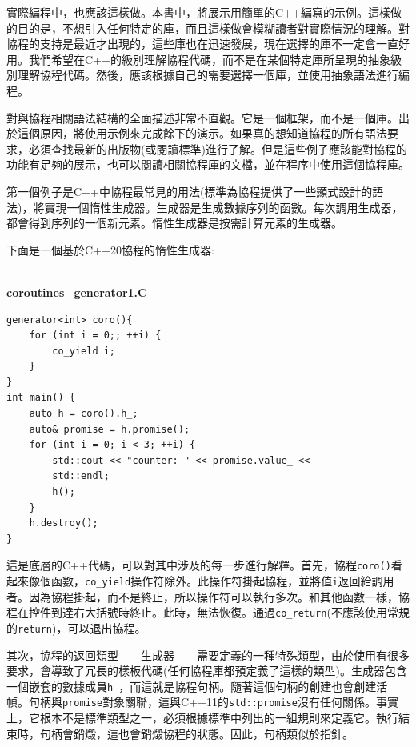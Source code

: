 實際編程中，也應該這樣做。本書中，將展示用簡單的C++編寫的示例。這樣做的目的是，不想引入任何特定的庫，而且這樣做會模糊讀者對實際情況的理解。對協程的支持是最近才出現的，這些庫也在迅速發展，現在選擇的庫不一定會一直好用。我們希望在C++的級別理解協程代碼，而不是在某個特定庫所呈現的抽象級別理解協程代碼。然後，應該根據自己的需要選擇一個庫，並使用抽象語法進行編程。

對與協程相關語法結構的全面描述非常不直觀。它是一個框架，而不是一個庫。出於這個原因，將使用示例來完成餘下的演示。如果真的想知道協程的所有語法要求，必須查找最新的出版物(或閱讀標準)進行了解。但是這些例子應該能對協程的功能有足夠的展示，也可以閱讀相關協程庫的文檔，並在程序中使用這個協程庫。


第一個例子是C++中協程最常見的用法(標準為協程提供了一些顯式設計的語法)，將實現一個惰性生成器。生成器是生成數據序列的函數。每次調用生成器，都會得到序列的一個新元素。惰性生成器是按需計算元素的生成器。

下面是一個基於C++20協程的惰性生成器:

\hspace*{\fill} \\ %
\noindent
\textbf{coroutines\_generator1.C}
\begin{lstlisting}[style=styleCXX]
generator<int> coro(){
	for (int i = 0;; ++i) {
		co_yield i;
	}
}
int main() {
	auto h = coro().h_;
	auto& promise = h.promise();
	for (int i = 0; i < 3; ++i) {
		std::cout << "counter: " << promise.value_ << 
		std::endl;
		h();
	}
	h.destroy();
}
\end{lstlisting}

這是底層的C++代碼，可以對其中涉及的每一步進行解釋。首先，協程\texttt{coro()}看起來像個函數，\texttt{co\_yield}操作符除外。此操作符掛起協程，並將值\texttt{i}返回給調用者。因為協程掛起，而不是終止，所以操作符可以執行多次。和其他函數一樣，協程在控件到達右大括號時終止。此時，無法恢復。通過\texttt{co\_return}(不應該使用常規的\texttt{return})，可以退出協程。

其次，協程的返回類型——生成器——需要定義的一種特殊類型，由於使用有很多要求，會導致了冗長的樣板代碼(任何協程庫都預定義了這樣的類型)。生成器包含一個嵌套的數據成員\texttt{h\_}，而這就是協程句柄。隨著這個句柄的創建也會創建活幀。句柄與\texttt{promise}對象關聯，這與C++11的\texttt{std::promise}沒有任何關係。事實上，它根本不是標準類型之一，必須根據標準中列出的一組規則來定義它。執行結束時，句柄會銷燬，這也會銷燬協程的狀態。因此，句柄類似於指針。

